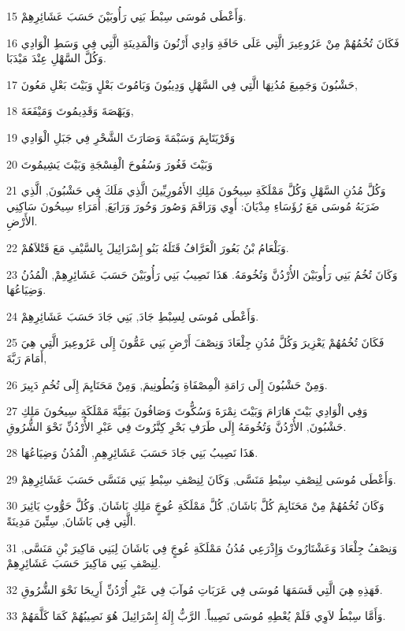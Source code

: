 \par 15 وَأَعْطَى مُوسَى سِبْطَ بَنِي رَأُوبَيْنَ حَسَبَ عَشَائِرِهِمْ.
\par 16 فَكَانَ تُخُمُهُمْ مِنْ عَرُوعِيرَ الَّتِي عَلَى حَافَةِ وَادِي أَرْنُونَ وَالْمَدِينَةِ الَّتِي فِي وَسَطِ الْوَادِي وَكُلَّ السَّهْلِ عِنْدَ مَيْدَبَا.
\par 17 حَشْبُونَ وَجَمِيعَ مُدُنِهَا الَّتِي فِي السَّهْلِ وَدِيبُونَ وَبَامُوتَ بَعْلٍ وَبَيْتَ بَعْلِ مَعُونَ,
\par 18 وَيَهْصَةَ وَقَدِيمُوتَ وَمَيْفَعَةَ,
\par 19 وَقَرْيَتَايِمَ وَسَبْمَةَ وَصَارَثَ الشَّحْرِ فِي جَبَلِ الْوَادِي
\par 20 وَبَيْتَ فَغُورَ وَسُفُوحَ الْفِسْجَةِ وَبَيْتَ يَشِيمُوتَ
\par 21 وَكُلَّ مُدُنِ السَّهْلِ وَكُلَّ مَمْلَكَةِ سِيحُونَ مَلِكِ الأَمُورِيِّينَ الَّذِي مَلَكَ فِي حَشْبُونَ, الَّذِي ضَرَبَهُ مُوسَى مَعَ رُؤَسَاءِ مِدْيَانَ: أَوِي وَرَاقَمَ وَصُورَ وَحُورَ وَرَابَعَ, أُمَرَاءِ سِيحُونَ سَاكِنِي الأَرْضِ.
\par 22 وَبَلْعَامُ بْنُ بَعُورَ الْعَرَّافُ قَتَلَهُ بَنُو إِسْرَائِيلَ بِالسَّيْفِ مَعَ قَتْلاَهُمْ.
\par 23 وَكَانَ تُخُمُ بَنِي رَأُوبَيْنَ الأُرْدُنَّ وَتُخُومَهُ. هَذَا نَصِيبُ بَنِي رَأُوبَيْنَ حَسَبَ عَشَائِرِهِمْ, الْمُدُنُ وَضِيَاعُهَا.
\par 24 وَأَعْطَى مُوسَى لِسِبْطِ جَادَ, بَنِي جَادَ حَسَبَ عَشَائِرِهِمْ.
\par 25 فَكَانَ تُخُمُهُمْ يَعْزِيرَ وَكُلَّ مُدُنِ جِلْعَادَ وَنِصْفَ أَرْضِ بَنِي عَمُّونَ إِلَى عَرُوعِيرَ الَّتِي هِيَ أَمَامَ رَبَّةَ,
\par 26 وَمِنْ حَشْبُونَ إِلَى رَامَةِ الْمِصْفَاةِ وَبُطُونِيمَ, وَمِنْ مَحَنَايِمَ إِلَى تُخُمِ دَبِيرَ.
\par 27 وَفِي الْوَادِي بَيْتَ هَارَامَ وَبَيْتَ نِمْرَةَ وَسُكُّوتَ وَصَافُونَ بَقِيَّةَ مَمْلَكَةِ سِيحُونَ مَلِكِ حَشْبُونَ, الأُرْدُنَّ وَتُخُومَهُ إِلَى طَرَفِ بَحْرِ كِنَّرُوتَ فِي عَبْرِ الأُرْدُنِّ نَحْوَ الشُّرُوقِ.
\par 28 هَذَا نَصِيبُ بَنِي جَادَ حَسَبَ عَشَائِرِهِمِ, الْمُدُنُ وَضِيَاعُهَا.
\par 29 وَأَعْطَى مُوسَى لِنِصْفِ سِبْطِ مَنَسَّى, وَكَانَ لِنِصْفِ سِبْطِ بَنِي مَنَسَّى حَسَبَ عَشَائِرِهِمْ.
\par 30 وَكَانَ تُخُمُهُمْ مِنْ مَحَنَايِمَ كُلَّ بَاشَانَ, كُلَّ مَمْلَكَةِ عُوجٍَ مَلِكِ بَاشَانَ, وَكُلَّ حَوُّوثِ يَائِيرَ الَّتِي فِي بَاشَانَ, سِتِّينَ مَدِينَةً.
\par 31 وَنِصْفُ جِلْعَادَ وَعَشْتَارُوثَ وَإِذْرَعِي مُدُنُ مَمْلَكَةِ عُوجٍَ فِي بَاشَانَ لِبَنِي مَاكِيرَ بْنِ مَنَسَّى, لِنِصْفِ بَنِي مَاكِيرَ حَسَبَ عَشَائِرِهِمْ.
\par 32 فَهَذِهِ هِيَ الَّتِي قَسَمَهَا مُوسَى فِي عَرَبَاتِ مُوآبَ فِي عَبْرِ أُرْدُنِّ أَرِيحَا نَحْوَ الشُّرُوقِ.
\par 33 وَأَمَّا سِبْطُ لاَوِي فَلَمْ يُعْطِهِ مُوسَى نَصِيباً. الرَّبُّ إِلَهُ إِسْرَائِيلَ هُوَ نَصِيبُهُمْ كَمَا كَلَّمَهُمْ.

